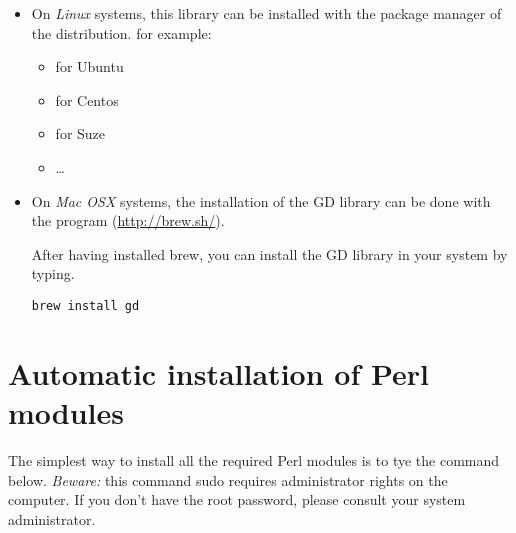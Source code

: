\documentclass[12pt,a4paper, oneside]{scrreprt} %
\begin{document}
\begin{itemize}

\item On \emph{Linux} systems, this library can be installed with the
  package manager of the distribution. for example:
  \begin{itemize}
  \item {} for Ubuntu
  \item  {} for Centos
  \item {} for Suze
  \item \ldots
  \end{itemize}
  
\item On \emph{Mac OSX} systems, the installation of the GD library
  can be done with the program  (\url{http://brew.sh/}).

  After having installed brew, you can install the GD library in your
  system by typing.
  \begin{lstlisting}
brew install gd
\end{lstlisting}
   
  



\end{itemize}

\section{Automatic installation of Perl modules}

The simplest way to install all the required Perl modules is to tye
the command below. \emph{Beware:} this command sudo requires
administrator rights on the computer. If you don't have the root
password, please consult your system administrator.
\end{document}
